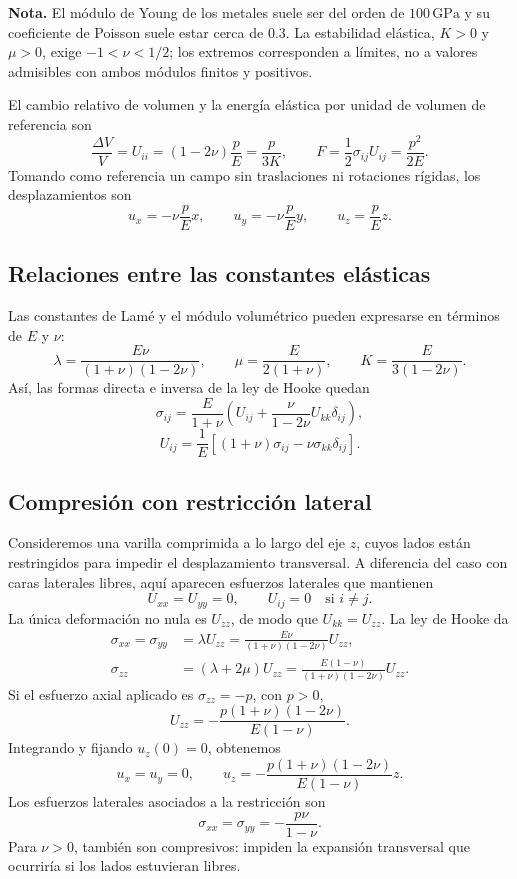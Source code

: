 \textbf{Nota.} El módulo de Young de los metales suele ser del orden de $100\,\mathrm{GPa}$ y su coeficiente de Poisson suele estar cerca de $0.3$. La estabilidad elástica, $K>0$ y $\mu>0$, exige $-1<\nu<1/2$; los extremos corresponden a límites, no a valores admisibles con ambos módulos finitos y positivos.

El cambio relativo de volumen y la energía elástica por unidad de volumen de referencia son
\[
\frac{\Delta V}{V}=U_{ii}
=(1-2\nu)\frac{p}{E}=\frac{p}{3K},
\qquad
F=\frac{1}{2}\sigma_{ij}U_{ij}
=\frac{p^2}{2E}.
\]
Tomando como referencia un campo sin traslaciones ni rotaciones rígidas, los desplazamientos son
\[
u_x=-\nu\frac{p}{E}x,
\qquad u_y=-\nu\frac{p}{E}y,
\qquad u_z=\frac{p}{E}z.
\]

\subsection{Relaciones entre las constantes elásticas}

Las constantes de Lamé y el módulo volumétrico pueden expresarse en términos de $E$ y $\nu$:
\[
\lambda=\frac{E\nu}{(1+\nu)(1-2\nu)},
\qquad
\mu=\frac{E}{2(1+\nu)},
\qquad
K=\frac{E}{3(1-2\nu)}.
\]
Así, las formas directa e inversa de la ley de Hooke quedan
\[
\sigma_{ij}=\frac{E}{1+\nu}
\left(U_{ij}+\frac{\nu}{1-2\nu}U_{kk}\delta_{ij}\right),
\]
\[
U_{ij}=\frac{1}{E}
\left[(1+\nu)\sigma_{ij}-\nu\sigma_{kk}\delta_{ij}\right].
\]

\subsection{Compresión con restricción lateral}

Consideremos una varilla comprimida a lo largo del eje $z$, cuyos lados están restringidos para impedir el desplazamiento transversal. A diferencia del caso con caras laterales libres, aquí aparecen esfuerzos laterales que mantienen
\[
U_{xx}=U_{yy}=0,
\qquad U_{ij}=0\quad\text{si }i\ne j.
\]
La única deformación no nula es $U_{zz}$, de modo que $U_{kk}=U_{zz}$. La ley de Hooke da
\[
\begin{aligned}
\sigma_{xx}=\sigma_{yy}
&=\lambda U_{zz}
=\frac{E\nu}{(1+\nu)(1-2\nu)}U_{zz},\\
\sigma_{zz}
&=(\lambda+2\mu)U_{zz}
=\frac{E(1-\nu)}{(1+\nu)(1-2\nu)}U_{zz}.
\end{aligned}
\]
Si el esfuerzo axial aplicado es $\sigma_{zz}=-p$, con $p>0$,
\[
\boxed{U_{zz}=-\frac{p(1+\nu)(1-2\nu)}{E(1-\nu)}}.
\]
Integrando y fijando $u_z(0)=0$, obtenemos
\[
u_x=u_y=0,
\qquad
u_z=-\frac{p(1+\nu)(1-2\nu)}{E(1-\nu)}z.
\]
Los esfuerzos laterales asociados a la restricción son
\[
\boxed{\sigma_{xx}=\sigma_{yy}=-\frac{p\nu}{1-\nu}}.
\]
Para $\nu>0$, también son compresivos: impiden la expansión transversal que ocurriría si los lados estuvieran libres.

